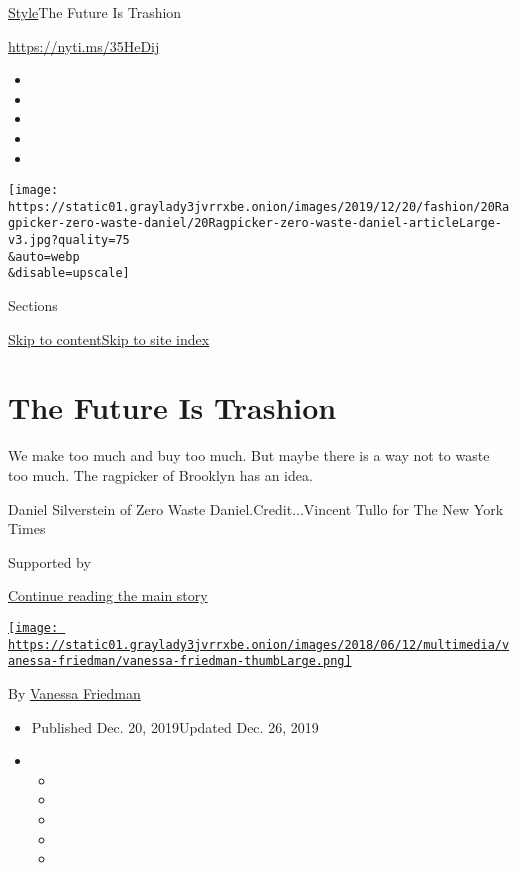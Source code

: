 \href{/section/style}{Style}\textbar{}The Future Is Trashion

\url{https://nyti.ms/35HeDij}

\begin{itemize}
\item
\item
\item
\item
\item
\end{itemize}

\texttt{[image: https://static01.graylady3jvrrxbe.onion/images/2019/12/20/fashion/20Ragpicker-zero-waste-daniel/20Ragpicker-zero-waste-daniel-articleLarge-v3.jpg?quality=75\\\&auto=webp\\\&disable=upscale]}

Sections

\protect\hyperlink{site-content}{Skip to
content}\protect\hyperlink{site-index}{Skip to site index}

\hypertarget{the-future-is-trashion}{%
\section{The Future Is Trashion}\label{the-future-is-trashion}}

We make too much and buy too much. But maybe there is a way not to waste
too much. The ragpicker of Brooklyn has an idea.

Daniel Silverstein of Zero Waste Daniel.Credit...Vincent Tullo for The
New York Times

Supported by

\protect\hyperlink{after-sponsor}{Continue reading the main story}

\href{https://www.nytimes3xbfgragh.onion/by/vanessa-friedman}{\texttt{[image: https://static01.graylady3jvrrxbe.onion/images/2018/06/12/multimedia/vanessa-friedman/vanessa-friedman-thumbLarge.png]}}

By \href{https://www.nytimes3xbfgragh.onion/by/vanessa-friedman}{Vanessa
Friedman}

\begin{itemize}
\item
  Published Dec. 20, 2019Updated Dec. 26, 2019
\item
  \begin{itemize}
  \item
  \item
  \item
  \item
  \item
  \end{itemize}
\end{itemize}

